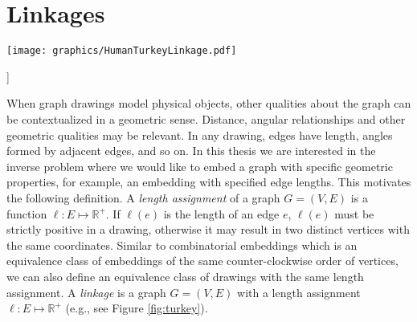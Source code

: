 \documentclass[10pt]{CSUNthesis}
\theoremstyle{plain}%
\theoremstyle{definition}
\theoremstyle{remark}
\newcommand{\bbr}{{\mathbb{R}}}
\begin{document}
\section{Linkages}

\begin{minipage}{\linewidth}
\begin{center}
\texttt{[image: graphics/HumanTurkeyLinkage.pdf]}
\label{fig:turkey}
\end{center}]
\end{minipage}

When graph drawings model physical objects, other qualities about the graph can be contextualized in a geometric sense.  
Distance, angular relationships and other geometric qualities may be relevant.
In any drawing, edges have length, angles formed by adjacent edges, and so on.  
In this thesis we are interested in the inverse problem where we would like to embed a graph with specific geometric properties, for example, an embedding with specified edge lengths. 
This motivates the following definition.
A \textit{length assignment} of a graph $G=(V,E)$ is a function $\ell:E \mapsto \bbr^+$. 
If $\ell(e)$ is the length of an edge $e$, $\ell(e)$ must be strictly positive in a drawing, otherwise it may result in two distinct vertices with the same coordinates.
Similar to combinatorial embeddings which is an equivalence class of embeddings of the same counter-clockwise order of vertices, we can also define an equivalence class of drawings with the same length assignment.
A \textit{linkage} is a graph $G = (V,E)$ with a length assignment $\ell:E \mapsto \bbr^+$ (e.g., see Figure \ref{fig:turkey}).
\end{document}
